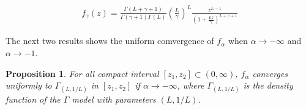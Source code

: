 \documentclass[journal]{IEEEtran}
\newtheorem{proposition}{Proposition}
\numberwithin{equation}{section}
\newcommand{\pa}[1]{\ensuremath{\left( #1 \right)}}
\begin{document}
\begin{align}
f_{\gamma}(z)=\frac{\Gamma\pa{L+\gamma+1}}{\Gamma\pa{\gamma+1}\Gamma\pa{L}}
\pa{\frac{L}{\gamma}}^L \frac{z^{L-1}}{\pa{1+\frac{Lz}{\gamma}}^{L+\gamma+1}}
\label{fgamma}
\end{align}


\vspace{0.2cm}

The next two results shows the uniform comvergence of $f_\alpha$ when $\alpha \to -\infty$ and $\alpha \to -1$.

\vspace{0.2cm}

\begin{proposition}
	For all compact interval $[z_{1},z_{2}]\subset\pa{0,\infty}$, $f_{\alpha}$ converges uniformly to $\Gamma_{(L,1/L)}$ in $[z_{1},z_{2}]$ if $\alpha\to -\infty$,
	where $\Gamma_{(L,1/L)}$ is the density function of the $\Gamma$ model with parameters $\pa{L,1/L}$.
	\label{pr: convergenciauniforme1}
\end{proposition}
\end{document}
